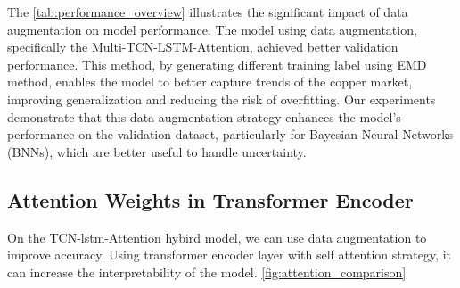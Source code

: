 \documentclass[final-report]{report-template}
\begin{document}
The \autoref{tab:performance_overview} illustrates the significant impact of data augmentation on model performance. The model using data augmentation, specifically the Multi-TCN-LSTM-Attention, achieved better validation performance. This method, by generating different training label using EMD method, enables the model to better capture trends of the copper market, improving generalization and reducing the risk of overfitting. Our experiments demonstrate that this data augmentation strategy enhances the model's performance on the validation dataset, particularly for Bayesian Neural Networks (BNNs), which are better useful to  handle uncertainty.

\subsection{Attention Weights in Transformer Encoder}
On the TCN-lstm-Attention hybird model, we can use data augmentation to improve accuracy. Using transformer encoder layer with self attention strategy, it can increase the interpretability of the model. \autoref{fig:attention_comparison}
\end{document}
